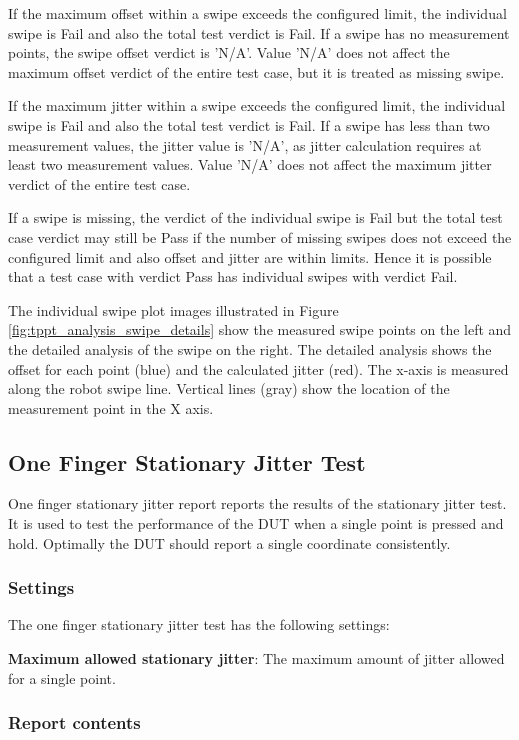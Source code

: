 If the maximum offset within a swipe exceeds the configured limit, the individual swipe is Fail and also the total test verdict is Fail. If a swipe has no measurement points, the swipe offset verdict is 'N/A'. Value 'N/A' does not affect the maximum offset verdict of the entire test case, but it is treated as missing swipe.

If the maximum jitter within a swipe exceeds the configured limit, the individual swipe is Fail and also the total test verdict is Fail. If a swipe has less than two measurement values, the jitter value is 'N/A', as jitter calculation requires at least two measurement values. Value 'N/A' does not affect the maximum jitter verdict of the entire test case.

If a swipe is missing, the verdict of the individual swipe is Fail but the total test case verdict may still be Pass if the number of missing swipes does not exceed the configured limit and also offset and jitter are within limits. Hence it is possible that a test case with verdict Pass has individual swipes with verdict Fail.

The individual swipe plot images illustrated in Figure \ref{fig:tppt_analysis_swipe_details} show the measured swipe points on the left and the detailed analysis of the swipe on the right. The detailed analysis shows the offset for each point (blue) and the calculated jitter (red). The x-axis is measured along the robot swipe line. Vertical lines (gray) show the location of the measurement point in the X axis. 

\subsection{One Finger Stationary Jitter Test}

One finger stationary jitter report reports the results of the stationary jitter test. It is used to test the performance of the DUT when a single point is pressed and hold. Optimally the DUT should report a single coordinate consistently.

\subsubsection{Settings}

The one finger stationary jitter test has the following settings:

\textbf{Maximum allowed stationary jitter}: The maximum amount of jitter allowed for a single point.

\subsubsection{Report contents}

